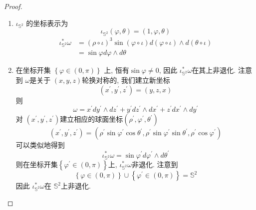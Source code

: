 \documentclass[../main.tex]{subfiles}
\begin{document}
\begin{proof}
\begin{enumerate}
\[\begin{aligned}
  &= 3( \rho ^{2}\sin  ^{3}\varphi \sin ^{2} \theta + \rho ^{2}\sin ^{3} \varphi \cos ^{2} \theta\\ 
   &+ \rho ^{2}\sin  \varphi \cos ^{2} \varphi \cos ^{2}  \theta + \rho ^{2}\sin  \varphi \cos ^{2} \varphi \sin ^{2} \theta  )d\rho \wedge d \varphi \wedge d \theta  \\ 
   &= 3\rho ^{2}\sin  \varphi d\rho \wedge d\varphi \wedge d \theta 
\end{aligned}
\]
\item \(  \iota _{\mathbb{S}^{2}}  \) 的坐标表示为 \[
\iota _{\mathbb{S}^{2}}\left( \varphi , \theta   \right) =\left(  1,\varphi , \theta  \right) 
\] \[
\begin{aligned}
\iota ^{*}_{\mathbb{S}^{2}} \omega &=  \left( \rho \circ \iota  \right)^{3}\sin  \left( \varphi \circ\iota \right)  d\left(  \varphi \circ \iota  \right)\wedge d\left(  \theta \circ \iota  \right)   \\ 
 &= \sin  \varphi d \varphi \wedge d \theta 
\end{aligned}
\]
\item 在坐标开集 \(  \left\{  \varphi \in \left( 0, \pi  \right)  \right\}  \) 上, 恒有\(  \sin  \varphi \neq 0  \), 因此 \(  \iota _{\mathbb{S}^{2}}^{*} \omega   \)在其上非退化.
注意到 \(   \omega   \)是关于 \(  \left( x,y,z \right)   \)轮换对称的, 我们建立新坐标 \[
\left( x^{\prime} , y^{\prime} ,z^{\prime}  \right)= \left( y,z,x \right)  
\] 则 \[
 \omega = x^{\prime} d y^{\prime} \wedge dz^{\prime} +  y^{\prime} dz^{\prime} \wedge dx^{\prime} + z^{\prime} dx^{\prime} \wedge dy^{\prime} 
\]对 \(  \left( x^{\prime} ,y^{\prime}  ,z^{\prime} \right)   \)建立相应的球面坐标\(  \left( \rho ^{\prime} , \varphi ^{\prime} , \theta ^{\prime}  \right)   \)  \[
\left( x^{\prime} ,y^{\prime} ,z^{\prime}  \right)= \left( \rho ^{\prime} \sin  \varphi ^{\prime} \cos  \theta  ^{\prime} ,\rho ^{\prime} \sin  \varphi ^{\prime} \sin  \theta ^{\prime} , \rho ^{\prime} \cos  \varphi ^{\prime}  \right)  
\]  可以类似地得到\[
\iota ^{*}_{\mathbb{S}^{2}} \omega = \sin  \varphi ^{\prime} d \varphi ^{\prime} \wedge d \theta ^{\prime} 
\]则在坐标开集\(  \left\{  \varphi ^{\prime} \in \left( 0, \pi  \right)  \right\}  \)上, \(  \iota ^{*}_{\mathbb{S}^{2}} \omega   \)非退化. 注意到 \[
\left\{  \varphi \in \left( 0, \pi  \right)  \right\}\cup \left\{  \varphi ^{\prime} \in \left( 0, \pi  \right)  \right\}= \mathbb{S}^{2}
\]  因此 \(  \iota ^{*}_{\mathbb{S}^{2}} \omega   \)在 \(  \mathbb{S}^{2}  \)上非退化.  
\end{enumerate}

\end{proof}
\end{document}

